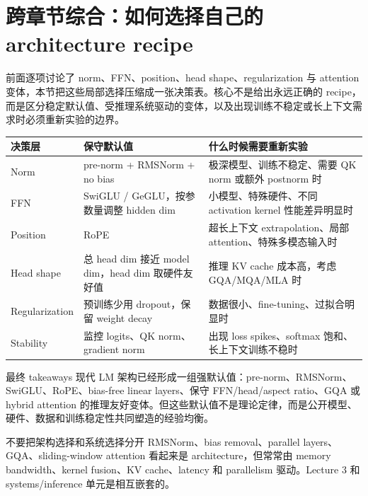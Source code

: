 \section{跨章节综合：如何选择自己的 architecture recipe}

前面逐项讨论了 norm、FFN、position、head shape、regularization 与 attention 变体，本节把这些局部选择压缩成一张决策表。核心不是给出永远正确的 recipe，而是区分稳定默认值、受推理系统驱动的变体，以及出现训练不稳定或长上下文需求时必须重新实验的边界。
\begin{longtable}{p{}p{}p{}}
\toprule
\textbf{决策层} & \textbf{保守默认值} & \textbf{什么时候需要重新实验} \\
\midrule
Norm & pre-norm + RMSNorm + no bias & 极深模型、训练不稳定、需要 QK norm 或额外 postnorm 时 \\
FFN & SwiGLU / GeGLU，按参数量调整 hidden dim & 小模型、特殊硬件、不同 activation kernel 性能差异明显时 \\
Position & RoPE & 超长上下文 extrapolation、局部 attention、特殊多模态输入时 \\
Head shape & 总 head dim 接近 model dim，head dim 取硬件友好值 & 推理 KV cache 成本高，考虑 GQA/MQA/MLA 时 \\
Regularization & 预训练少用 dropout，保留 weight decay & 数据很小、fine-tuning、过拟合明显时 \\
Stability & 监控 logits、QK norm、gradient norm & 出现 loss spikes、softmax 饱和、长上下文训练不稳时 \\
\bottomrule
\end{longtable}
\begin{importantbox}{最终 takeaways}
现代 LM 架构已经形成一组强默认值：pre-norm、RMSNorm、SwiGLU、RoPE、bias-free linear layers、保守 FFN/head/aspect ratio、GQA 或 hybrid attention 的推理友好变体。但这些默认值不是理论定律，而是公开模型、硬件、数据和训练稳定性共同塑造的经验均衡。
\end{importantbox}
\begin{warningbox}{不要把架构选择和系统选择分开}
RMSNorm、bias removal、parallel layers、GQA、sliding-window attention 看起来是 architecture，但常常由 memory bandwidth、kernel fusion、KV cache、latency 和 parallelism 驱动。Lecture 3 和 systems/inference 单元是相互嵌套的。
\end{warningbox}

